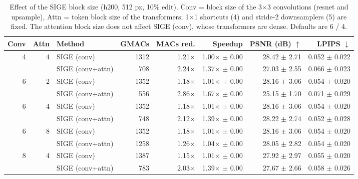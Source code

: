 \begin{table}[t]
\centering
\small
\caption{Effect of the SIGE block size (h200, 512 px, 10\% edit). Conv = block size of the 3$\times$3 convolutions (resnet and upsample), Attn = token block size of the transformers; 1$\times$1 shortcuts (4) and stride-2 downsamplers (5) are fixed. The attention block size does not affect SIGE (conv), whose transformers are dense. Defaults are 6 / 4.}
\label{tab:block_size_h200}
\begin{tabular}{rrlrrrrr}
\toprule
Conv & Attn & Method & GMACs & MACs red. & Speedup & PSNR (dB) $\uparrow$ & LPIPS $\downarrow$ \\
\midrule
4 & 4 & SIGE (conv) & 1312 & 1.21$\times$ & 1.00$\times$ $\pm$ 0.00 & 28.42 $\pm$ 2.71 & 0.052 $\pm$ 0.022 \\
 &  & SIGE (conv+attn) & 708 & 2.24$\times$ & 1.37$\times$ $\pm$ 0.00 & 27.03 $\pm$ 2.55 & 0.066 $\pm$ 0.023 \\
\midrule
6 & 2 & SIGE (conv) & 1352 & 1.18$\times$ & 1.01$\times$ $\pm$ 0.00 & 28.16 $\pm$ 3.06 & 0.054 $\pm$ 0.020 \\
 &  & SIGE (conv+attn) & 556 & 2.86$\times$ & 1.67$\times$ $\pm$ 0.00 & 25.15 $\pm$ 1.70 & 0.071 $\pm$ 0.029 \\
\midrule
6 & 4 & SIGE (conv) & 1352 & 1.18$\times$ & 1.01$\times$ $\pm$ 0.00 & 28.16 $\pm$ 3.06 & 0.054 $\pm$ 0.020 \\
 &  & SIGE (conv+attn) & 748 & 2.12$\times$ & 1.39$\times$ $\pm$ 0.00 & 28.22 $\pm$ 2.74 & 0.052 $\pm$ 0.028 \\
\midrule
6 & 8 & SIGE (conv) & 1352 & 1.18$\times$ & 1.01$\times$ $\pm$ 0.00 & 28.16 $\pm$ 3.06 & 0.054 $\pm$ 0.020 \\
 &  & SIGE (conv+attn) & 1258 & 1.26$\times$ & 1.04$\times$ $\pm$ 0.00 & 28.05 $\pm$ 2.82 & 0.054 $\pm$ 0.020 \\
\midrule
8 & 4 & SIGE (conv) & 1387 & 1.15$\times$ & 1.01$\times$ $\pm$ 0.00 & 27.92 $\pm$ 2.97 & 0.055 $\pm$ 0.020 \\
 &  & SIGE (conv+attn) & 783 & 2.03$\times$ & 1.39$\times$ $\pm$ 0.00 & 27.67 $\pm$ 2.66 & 0.058 $\pm$ 0.026 \\
\bottomrule
\end{tabular}
\end{table}


